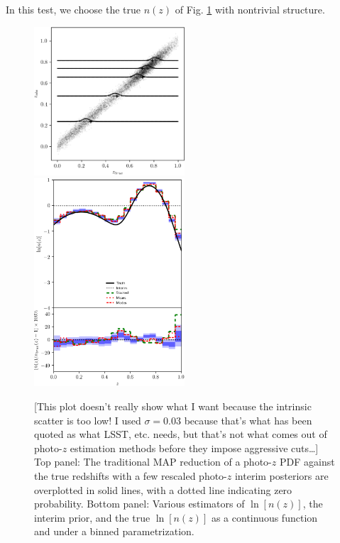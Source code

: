 \documentclass[iop]{emulateapj}
\begin{document}
In this test, we choose the true $n(z)$ of Fig. \ref{fig:featured} with nontrivial structure.

\begin{figure}
	\begin{center}
		\includegraphics[width=0.5\textwidth]{fig/fiducial/scatter.png}\\
		\includegraphics[width=0.5\textwidth]{fig/fiducial/estimators.png}		
		\caption{[This plot doesn't really show what I want because the intrinsic scatter is too low!  I used $\sigma=0.03$ because that's what has been quoted as what LSST, etc. needs, but that's not what comes out of photo-$z$ estimation methods before they impose aggressive cuts\dots]  Top panel: The traditional MAP reduction of a photo-$z$ PDF against the true redshifts with a few rescaled photo-$z$ interim posteriors are overplotted in solid lines, with a dotted line indicating zero probability.  Bottom panel: Various estimators of $\ln[n(z)]$, the interim prior, and the true $\ln[n(z)]$ as a continuous function and under a binned parametrization.}
		\label{fig:featured}
	\end{center}
\end{figure}
\end{document}
